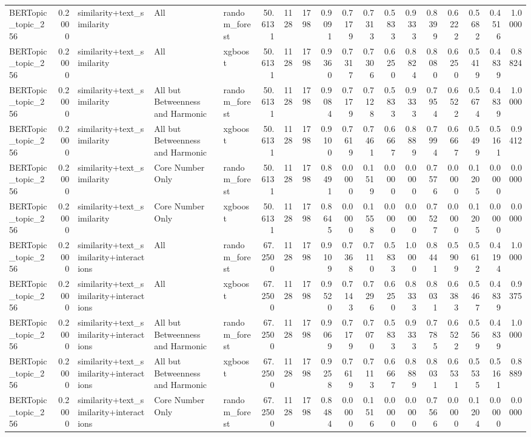 \begin{tabular}{lrlllrrrrrrrrrrrrr}
BERTopic_topic_256 & 0.2000 & similarity+text_similarity & All & random_forest & 50.6131 & 1128 & 1798 & 0.9091 & 0.7179 & 0.7313 & 0.5833 & 0.9333 & 0.8399 & 0.6222 & 0.5682 & 0.4516 & 1.0000 \\
BERTopic_topic_256 & 0.2000 & similarity+text_similarity & All & xgboost & 50.6131 & 1128 & 1798 & 0.9360 & 0.7317 & 0.7306 & 0.6250 & 0.8824 & 0.8080 & 0.6250 & 0.5419 & 0.4839 & 0.8824 \\
BERTopic_topic_256 & 0.2000 & similarity+text_similarity & All but Betweenness and Harmonic & random_forest & 50.6131 & 1128 & 1798 & 0.9084 & 0.7179 & 0.7128 & 0.5833 & 0.9333 & 0.7954 & 0.6522 & 0.5674 & 0.4839 & 1.0000 \\
BERTopic_topic_256 & 0.2000 & similarity+text_similarity & All but Betweenness and Harmonic & xgboost & 50.6131 & 1128 & 1798 & 0.9100 & 0.7619 & 0.7461 & 0.6667 & 0.8889 & 0.7994 & 0.6667 & 0.5499 & 0.5161 & 0.9412 \\
BERTopic_topic_256 & 0.2000 & similarity+text_similarity & Core Number Only & random_forest & 50.6131 & 1128 & 1798 & 0.8491 & 0.0000 & 0.1519 & 0.0000 & 0.0000 & 0.7576 & 0.0000 & 0.1205 & 0.0000 & 0.0000 \\
BERTopic_topic_256 & 0.2000 & similarity+text_similarity & Core Number Only & xgboost & 50.6131 & 1128 & 1798 & 0.8645 & 0.0000 & 0.1558 & 0.0000 & 0.0000 & 0.7527 & 0.0000 & 0.1205 & 0.0000 & 0.0000 \\
BERTopic_topic_256 & 0.2000 & similarity+text_similarity+interactions & All & random_forest & 67.2500 & 1128 & 1798 & 0.9109 & 0.7368 & 0.7110 & 0.5833 & 1.0000 & 0.8441 & 0.5909 & 0.5612 & 0.4194 & 1.0000 \\
BERTopic_topic_256 & 0.2000 & similarity+text_similarity+interactions & All & xgboost & 67.2500 & 1128 & 1798 & 0.9520 & 0.7143 & 0.7296 & 0.6250 & 0.8333 & 0.8031 & 0.6383 & 0.5467 & 0.4839 & 0.9375 \\
BERTopic_topic_256 & 0.2000 & similarity+text_similarity+interactions & All but Betweenness and Harmonic & random_forest & 67.2500 & 1128 & 1798 & 0.9069 & 0.7179 & 0.7070 & 0.5833 & 0.9333 & 0.7785 & 0.6522 & 0.5569 & 0.4839 & 1.0000 \\
BERTopic_topic_256 & 0.2000 & similarity+text_similarity+interactions & All but Betweenness and Harmonic & xgboost & 67.2500 & 1128 & 1798 & 0.9258 & 0.7619 & 0.7113 & 0.6667 & 0.8889 & 0.8031 & 0.6531 & 0.5535 & 0.5161 & 0.8889 \\
BERTopic_topic_256 & 0.2000 & similarity+text_similarity+interactions & Core Number Only & random_forest & 67.2500 & 1128 & 1798 & 0.8484 & 0.0000 & 0.1516 & 0.0000 & 0.0000 & 0.7566 & 0.0000 & 0.1204 & 0.0000 & 0.0000 \\

\end{tabular}
